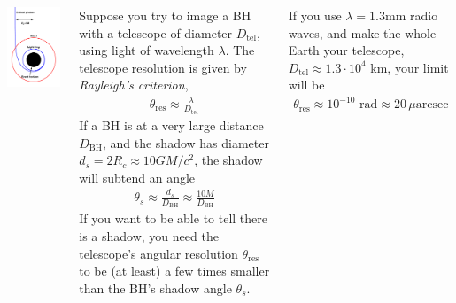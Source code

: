 \documentclass[25pt, a0paper, landscape]{tikzposter}
\begin{document}
\begin{columns}
{\begin{center}
        \vspace{1em}

        \includegraphics[width=20em]{bh-dist-fig}
      \end{center}

    }

    {
      Suppose you try to image a BH with a telescope of diameter
      $D_{\text{tel}}$, using light of wavelength $\lambda$. The
      telescope resolution is given by \emph{Rayleigh’s criterion},
      \begin{align*}
        \theta_{\text{res}} \approx \frac{\lambda}{D_{\text{tel}}}
      \end{align*}
      If a BH is at a very large distance $D_{\text{BH}}$, and the
      shadow has diameter $d_{s}=2R_{c}\approx 10GM/c^{2}$, the shadow
      will subtend an angle
      \begin{align*}
        \theta_{s} \approx \frac{d_{s}}{D_{\text{BH}}} \approx \frac{10 M}{D_{\text{BH}}}
      \end{align*}
      If you want to be able to tell there is a shadow, you need the
      telescope’s angular resolution $\theta_{\text{res}}$ to be (at
      least) a few times smaller than the BH’s shadow angle
      $\theta_{s}$.

      If you use $\lambda=1.3$mm radio waves, and make the whole Earth
      your telescope, $D_{\text{tel}} \approx 1.3\cdot 10^{4}$ km,
      your limit will be
      \begin{align*}
        \theta_{\text{res}} \approx 10^{-10} \text{ rad} \approx 20 \,\mu\text{arcsec}
      \end{align*}

}
\end{columns}
\end{document}
